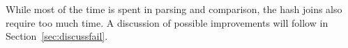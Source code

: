 \documentclass[a4paper, 12pt]{article}
\begin{document}
While most of the time is spent in parsing and comparison, the hash
joins also require too much time. A discussion of possible
improvements will follow in Section~\ref{sec:discussfail}.





\end{document}
